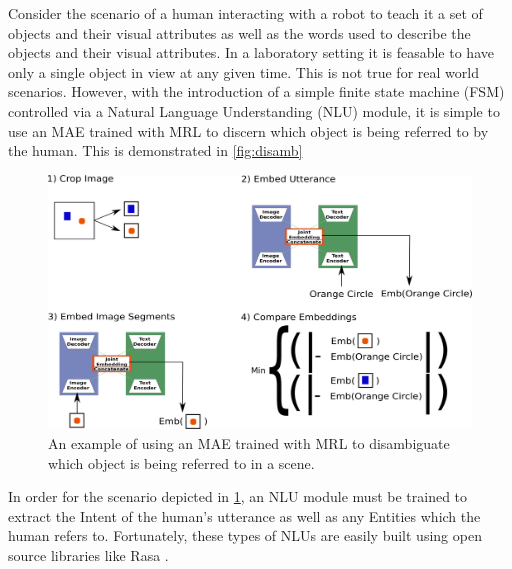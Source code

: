 Consider the scenario of a human interacting with a robot to teach it a set of objects and their visual attributes as well as the words used to describe the objects and their visual attributes. In a laboratory setting it is feasable to have only a single object in view at any given time. This is not true for real world scenarios. However, with the introduction of a simple finite state machine (FSM) controlled via a Natural Language Understanding (NLU) module, it is simple to use an MAE trained with MRL to discern which object is being referred to by the human. This is demonstrated in \autoref{fig:disamb}

\begin{figure}
\centering
\includegraphics[width=\textwidth]{Figs/shapes/findingRefferant.png}
\caption{An example of using an MAE trained with MRL to disambiguate which object is being referred to in a scene.}
\label{fig:disamb}
\end{figure}

In order for the scenario depicted in \ref{fig:disamb}, an NLU module must be trained to extract the Intent of the human's utterance as well as any Entities which the human refers to. Fortunately, these types of NLUs are easily built using open source libraries like Rasa \cite{rasa}.




